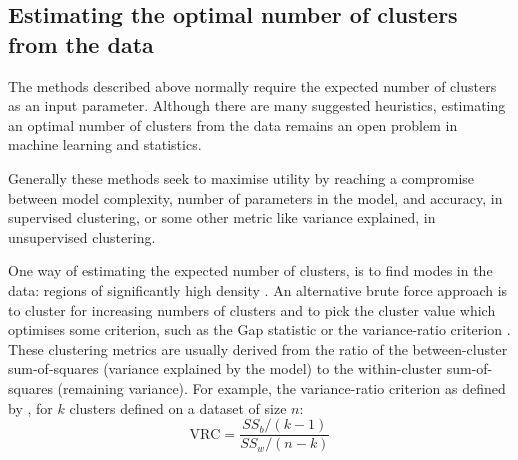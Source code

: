 \subsection{Estimating the optimal number of clusters from the data}

The methods described above normally require the expected number of clusters as an input parameter.
Although there are many suggested heuristics,
estimating an optimal number of clusters from the data remains an open problem in machine learning and statistics.



Generally these methods seek to maximise utility by reaching a compromise between model complexity, number of parameters in the model,
and accuracy, in supervised clustering, or some other metric like variance explained, in unsupervised clustering.

One way of estimating the expected number of clusters, is to find modes in the data: regions of significantly high density \citep{Duong:2008eu,JING:2012ek}.
An alternative brute force approach is to cluster for increasing numbers of clusters 
and to pick the cluster value which optimises some criterion, such as the Gap statistic \citep{Tibshirani:2001fj}
or the variance-ratio criterion \citep{Calinski:1974bt}.
These clustering metrics are usually derived from the ratio of the between-cluster sum-of-squares (variance explained by the model)
to the within-cluster sum-of-squares (remaining variance).
For example, the variance-ratio criterion as defined by \citet{Calinski:1974bt}, for $k$ clusters defined on a dataset of size $n$:
\[
  \text{VRC} = \frac{SS_{b}/(k-1)}{SS_{w}/(n-k)}
\]

